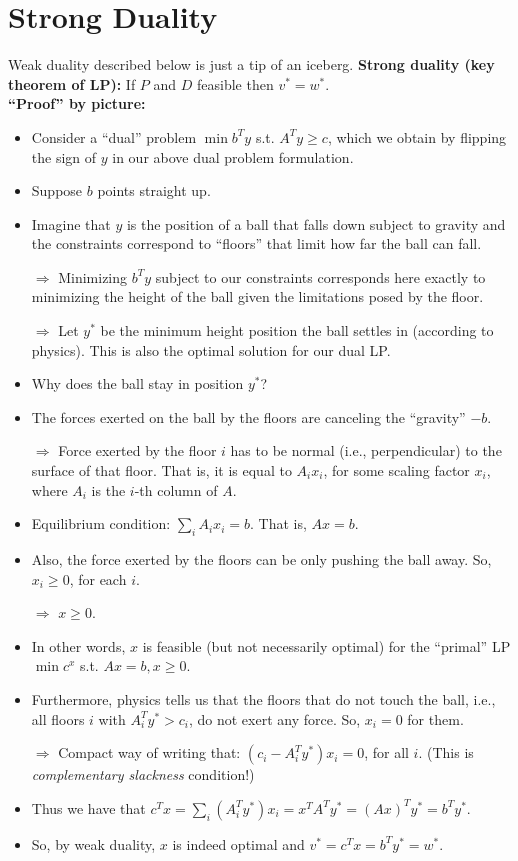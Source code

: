 \documentclass{article}
\begin{document}
\section{Strong Duality}

Weak duality described below is just a tip of an iceberg.
{\bf Strong duality (key theorem of LP):} If $P$ and $D$ feasible then $v^*=w^*$. \\

{\bf ``Proof'' by picture:}
\begin{itemize}
\item Consider a ``dual'' problem $\min b^Ty$ s.t. $A^Ty \ge c$, which we obtain by flipping the sign of $y$ in our above dual problem formulation.
\item Suppose $b$ points straight up.
\item  Imagine that $y$ is the position of a ball that falls down subject to gravity and the constraints correspond to ``floors'' that limit how far the ball can fall.

$\Rightarrow$ Minimizing $b^T y$ subject to our constraints corresponds here exactly to minimizing the height of the ball given the limitations posed by the floor. 

$\Rightarrow$ Let $y^*$ be the minimum height position the ball settles in (according to physics). This is also the optimal solution for our dual LP.  

\item Why does the ball stay in position $y^*$? 
\item The forces exerted on the ball by the floors are canceling the ``gravity'' $-b$.

$\Rightarrow$ Force exerted by the floor $i$ has to be normal (i.e., perpendicular) to the surface of that floor. That is, it is equal to $A_i x_i$, for some scaling factor $x_i$, where $A_i$ is the $i$-th column of $A$. 

\item Equilibrium condition: $\sum_i A_i x_i = b$. That is, $Ax=b$. 
\item Also, the force exerted by the floors can be only pushing the ball away. So, $x_i\geq 0$, for each $i$. 

$\Rightarrow$ $x\geq 0$. 
\item In other words, $x$ is feasible (but not necessarily optimal) for the ``primal'' LP $\min c^x$ s.t. $Ax=b, x\geq 0$. 
\item Furthermore, physics tells us that the floors that do not touch the ball, i.e., all floors $i$ with $A_i^T y^{*} >c_i$, do not exert any force. So, $x_i=0$ for them. 

$\Rightarrow$ Compact way of writing that: $(c_i-A_i^Ty^{*})x_i=0$, for all $i$. (This is {\em complementary slackness} condition!)
\item Thus we have that $c^T x = \sum_i (A_i^T y^{*}) x_i = x^T A^T y^{*} = (Ax)^Ty^{*}=b^Ty^{*}$.
\item So, by weak duality, $x$ is indeed optimal and $v^*=c^Tx=b^Ty^*=w^*$. 
\end{itemize}
\end{document}
